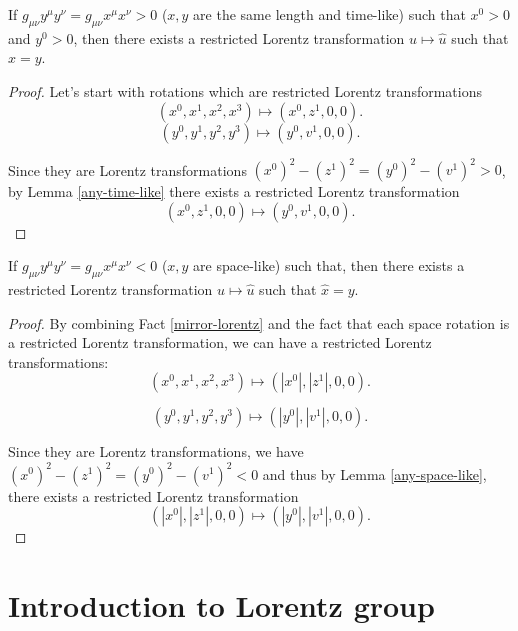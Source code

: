 \documentclass[main.tex]{subfiles}
\begin{document}
\begin{fact}
If $g_{\mu\nu} y^\mu y^\nu = g_{\mu\nu} x^\mu x^\nu > 0$ ($x, y$ are the same length and time-like) such that $x^0 > 0$ and $y^0 > 0$, then there exists a restricted Lorentz transformation $u \mapsto \hat{u}$ such that $\hat{x} = y$.
\end{fact}
\begin{proof}
Let's start with rotations which are restricted Lorentz transformations
\begin{equation}
(x^0, x^1, x^2, x^3) \mapsto (x^0, z^1, 0, 0).
\end{equation}
\begin{equation}
(y^0, y^1, y^2, y^3) \mapsto (y^0, v^1, 0, 0).
\end{equation}

Since they are Lorentz transformations $(x^0)^2 - (z^1)^2 = (y^0)^2 - (v^1)^2 > 0$,
by Lemma \ref{any-time-like} there exists a restricted Lorentz transformation
\begin{equation}
(x^0, z^1, 0, 0) \mapsto (y^0, v^1, 0, 0).
\end{equation}
\end{proof}

\begin{fact}
If $g_{\mu\nu} y^\mu y^\nu = g_{\mu\nu} x^\mu x^\nu < 0$ ($x, y$ are space-like) such that, then there exists a restricted Lorentz transformation $u \mapsto \hat{u}$ such that $\hat{x} = y$.
\end{fact}
\begin{proof}
By combining Fact \ref{mirror-lorentz} and the fact that each space rotation is a restricted Lorentz transformation, we can have a restricted Lorentz transformations:
\begin{equation}
(x^0, x^1, x^2, x^3) \mapsto (|x^0|, |z^1|, 0, 0).
\end{equation}

\begin{equation}
(y^0, y^1, y^2, y^3) \mapsto (|y^0|, |v^1|, 0, 0).
\end{equation}

Since they are Lorentz transformations, we have $(x^0)^2 - (z^1)^2 = (y^0)^2 - (v^1)^2 < 0$ and thus by Lemma \ref{any-space-like}, there exists a restricted Lorentz transformation
\begin{equation}
(|x^0|, |z^1|, 0, 0) \mapsto (|y^0|, |v^1|, 0, 0).
\end{equation}
\end{proof}  

\section{Introduction to Lorentz group}
\end{document}
